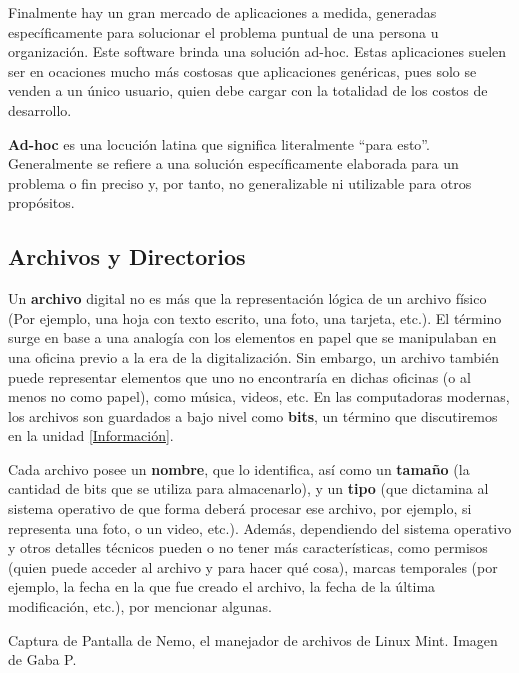 Finalmente hay un gran mercado de aplicaciones a medida, generadas específicamente
para solucionar el problema puntual de una persona u organización. Este software
brinda una solución ad-hoc. Estas aplicaciones suelen ser en ocaciones mucho más
costosas que aplicaciones genéricas, pues solo se venden a un único usuario,
quien debe cargar con la totalidad de los costos de desarrollo.

\begin{definition}
    \textbf{Ad-hoc} es una locución latina que significa literalmente ``para
    esto''. Generalmente se refiere a una solución específicamente elaborada
    para un problema o fin preciso y, por tanto, no generalizable ni utilizable
    para otros propósitos.
\end{definition}

\subsection{Archivos y Directorios}

Un \textbf{archivo} digital no es más que la representación lógica de un archivo
físico (Por ejemplo, una hoja con texto escrito, una foto, una tarjeta, etc.).
El término surge en base a una analogía con los elementos en papel que se manipulaban
en una oficina previo a la era de la digitalización. Sin embargo, un archivo
también puede representar elementos que uno no encontraría en dichas oficinas
(o al menos no como papel), como música, videos, etc. En las computadoras modernas,
los archivos son guardados a bajo nivel como \textbf{bits}, un término que
discutiremos en la unidad \ref{Información}.

Cada archivo posee un \textbf{nombre}, que lo identifica, así como un
\textbf{tamaño} (la cantidad de bits que se utiliza para almacenarlo), y un
\textbf{tipo} (que dictamina al sistema operativo de que forma deberá procesar
ese archivo, por ejemplo, si representa una foto, o un video, etc.). Además,
dependiendo del sistema operativo y otros detalles técnicos pueden o no tener
más características, como permisos (quien puede acceder al archivo y para
hacer qué cosa), marcas temporales (por ejemplo, la fecha en la que fue creado
el archivo, la fecha de la última modificación, etc.), por mencionar algunas.

{Captura de Pantalla de Nemo, el manejador de archivos de Linux Mint.}
{Imagen de Gaba P.}

